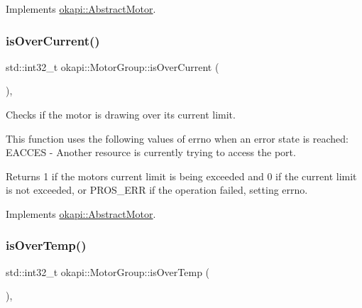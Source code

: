Implements \mbox{\hyperlink{classokapi_1_1AbstractMotor_a07079ee87a07b98b7008f2ce91c645ea}{okapi\+::\+Abstract\+Motor}}.

\mbox{\label{classokapi_1_1MotorGroup_ab714cb81d252599ab2933e13cc8af40d}} 
\subsubsection{\texorpdfstring{isOverCurrent()}{isOverCurrent()}}
{\footnotesize\ttfamily std\+::int32\+\_\+t okapi\+::\+Motor\+Group\+::is\+Over\+Current (\begin{DoxyParamCaption}{ }\end{DoxyParamCaption})\hspace{0.3cm}{\ttfamily [override]}, {\ttfamily [virtual]}}

Checks if the motor is drawing over its current limit.

This function uses the following values of errno when an error state is reached\+: E\+A\+C\+C\+ES -\/ Another resource is currently trying to access the port.

\begin{DoxyReturn}{Returns}
1 if the motor\textquotesingle{}s current limit is being exceeded and 0 if the current limit is not exceeded, or P\+R\+O\+S\+\_\+\+E\+RR if the operation failed, setting errno. 
\end{DoxyReturn}


Implements \mbox{\hyperlink{classokapi_1_1AbstractMotor_a3d365496ebb8566c0a12611f090c5231}{okapi\+::\+Abstract\+Motor}}.

\mbox{\label{classokapi_1_1MotorGroup_a60eaf29b00c8c0f26b9e70f3f28f74be}} 
\subsubsection{\texorpdfstring{isOverTemp()}{isOverTemp()}}
{\footnotesize\ttfamily std\+::int32\+\_\+t okapi\+::\+Motor\+Group\+::is\+Over\+Temp (\begin{DoxyParamCaption}{ }\end{DoxyParamCaption})\hspace{0.3cm}{\ttfamily [override]}, {\ttfamily [virtual]}}

